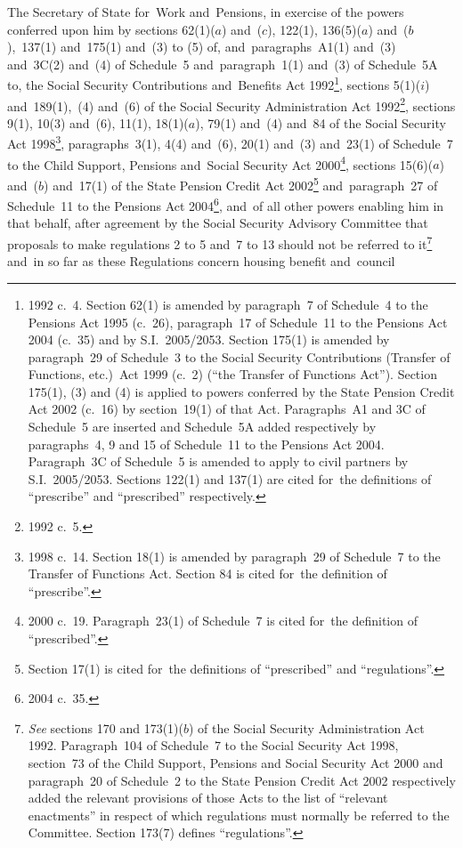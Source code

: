 \documentclass[12pt,a4paper]{article}
\title{\regstitle}
\author{S.I.\ 2005 No.\ 2677}
\date{Made
26th September 2005\\
Laid before Parliament
3rd October 2005\\
Coming into~force
6th April 2006
}
\begin{document}
\maketitle

\enlargethispage{1.65405pt}

\noindent
The Secretary of State for~Work and~Pensions, in exercise of the powers conferred upon him by sections 62(1)($a$)  and~($c$), 122(1), 136(5)($a$)  and~($b$),~137(1) and~175(1) and~(3) to (5) of, and~paragraphs~A1(1) and~(3) and~3C(2) and~(4) of Schedule~5 and~paragraph~1(1) and~(3) of Schedule~5A to, the Social Security Contributions and~Benefits Act 1992\footnote{1992 c.~4. Section 62(1) is amended by paragraph~7 of Schedule~4 to the Pensions Act 1995 (c.~26), paragraph~17 of Schedule~11 to the Pensions Act 2004 (c.~35) and by S.I.~2005/2053. Section 175(1) is amended by paragraph~29 of Schedule~3 to the Social Security Contributions (Transfer of Functions, etc.)\ Act 1999 (c.~2) (“the Transfer of Functions Act”). Section 175(1), (3) and (4) is applied to powers conferred by the State Pension Credit Act 2002 (c.~16) by section~19(1) of that Act. Paragraphs~A1 and 3C of Schedule~5 are inserted and Schedule~5A added respectively by paragraphs~4, 9 and 15 of Schedule~11 to the Pensions Act 2004. Paragraph~3C of Schedule~5 is amended to apply to civil partners by S.I.~2005/2053. Sections 122(1) and 137(1) are cited for~the definitions of “prescribe” and “prescribed” respectively.}, sections 5(1)($i$) and~189(1),~(4) and~(6) of the Social Security Administration Act 1992\footnote{1992 c.~5.}, sections 9(1), 10(3) and~(6), 11(1), 18(1)($a$), 79(1) and~(4) and~84 of the Social Security Act 1998\footnote{1998 c.~14. Section 18(1) is amended by paragraph~29 of Schedule~7 to the Transfer of Functions Act. Section 84 is cited for~the definition of “prescribe”.}, paragraphs~3(1), 4(4) and~(6), 20(1) and~(3) and~23(1) of Schedule~7 to the Child Support, Pensions and~Social Security Act 2000\footnote{2000 c.~19. Paragraph~23(1) of Schedule~7 is cited for~the definition of “prescribed”.}, sections 15(6)($a$)  and~($b$)  and~17(1) of the State Pension Credit Act 2002\footnote{Section 17(1) is cited for~the definitions of “prescribed” and “regulations”.} and~paragraph~27 of Schedule~11 to the Pensions Act 2004\footnote{2004 c.~35.}, and~of all other powers enabling him in that behalf, after agreement by the Social Security Advisory Committee that proposals to make regulations 2 to 5 and~7 to 13 should not be referred to it\footnote{\emph{See} sections 170 and 173(1)($b$) of the Social Security Administration Act 1992. Paragraph~104 of Schedule~7 to the Social Security Act 1998, section~73 of the Child Support, Pensions and Social Security Act 2000 and paragraph~20 of Schedule~2 to the State Pension Credit Act 2002 respectively added the relevant provisions of those Acts to the list of “relevant enactments” in respect of which regulations must normally be referred to the Committee. Section 173(7) defines “regulations”.} and~in so far as these Regulations concern housing benefit and~council 
\end{document}
